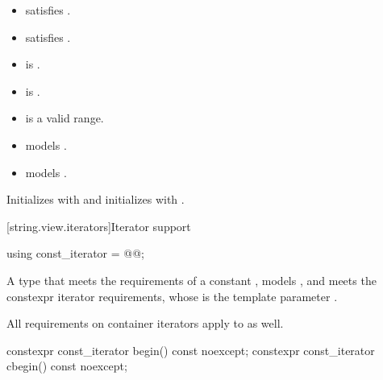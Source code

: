 \begin{itemdescr}
\pnum
\constraints
\begin{itemize}
\item {} satisfies .
\item {} satisfies .
\item {} is .
\item {} is .
\end{itemize}

\pnum
\expects
\begin{itemize}
\item {} is a valid range.
\item {} models .
\item {} models .
\end{itemize}

\pnum
\effects
Initializes  with  and
initializes  with .
\end{itemdescr}

[string.view.iterators]{Iterator support}

%
\begin{itemdecl}
using const_iterator = @@;
\end{itemdecl}

\begin{itemdescr}
\pnum
A type that meets the requirements
of a constant
,
models , and
meets the constexpr iterator requirements,
whose  is the template parameter .

\pnum
All requirements on container iterators apply to  as well.
\end{itemdescr}

%
%
\begin{itemdecl}
constexpr const_iterator begin() const noexcept;
constexpr const_iterator cbegin() const noexcept;
\end{itemdecl}

